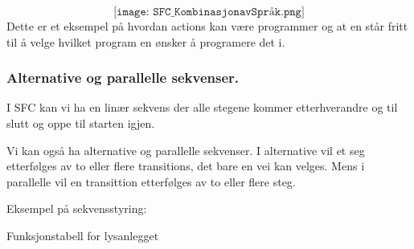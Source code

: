 $$\texttt{[image: SFC\_KombinasjonavSpråk.png]}$$
\vskip 2.5pt 
Dette er et eksempel på hvordan actions kan være programmer og at en står fritt til å velge hvilket program en ønsker å programere det i. 
\subsubsection{Alternative og parallelle sekvenser. }

I SFC kan vi ha en linær sekvens der alle stegene kommer etterhverandre
og til slutt og oppe til starten igjen. 

Vi kan også ha alternative og parallelle sekvenser. I alternative
vil et seg etterfølges av to eller flere transitions, det bare en
vei kan velges. Mens i parallelle vil en transittion etterfølges av
to eller flere steg. 


Eksempel på sekvensstyring:

\begin{center}
\par\end{center}

Funksjonstabell for lysanlegget

\begin{center}
\par\end{center}


















